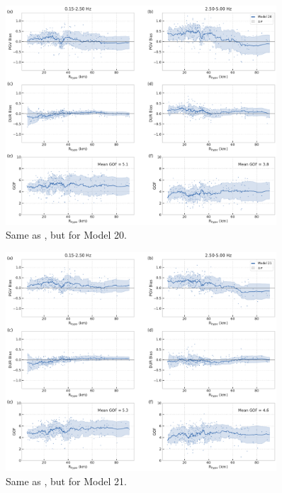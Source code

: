 \begin{figure}[!ht]
  \centering
  \includegraphics[width=0.9\textwidth,height=0.9\textheight,keepaspectratio]{figures/figure_highf_S30.pdf}
  \caption{Same as , but for Model 20.
  }
\label{fig:highf-S30}
\end{figure}
\clearpage


\begin{figure}[!ht]
  \centering
  \includegraphics[width=0.9\textwidth,height=0.9\textheight,keepaspectratio]{figures/figure_highf_S31.pdf}
  \caption{Same as , but for Model 21.
  }
\label{fig:highf-S31}
\end{figure}
\clearpage


